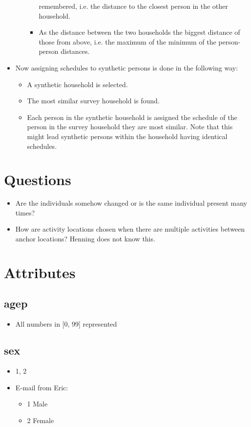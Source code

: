 \documentclass[12pt]{article}
\begin{document}
\begin{itemize}
\begin{itemize}
\begin{itemize}
remembered, i.e. the distance to the closest person in the other household.
\item
As the distance between the two households the biggest distance of those from
above, i.e. the maximum of the minimum of the person-person distances.
\end{itemize}
\end{itemize}
\item
Now assigning schedules to synthetic persons is done in the following way:
\begin{itemize}
\item
A synthetic household is selected.
\item
The most similar survey household is found.
\item
Each person in the synthetic household is assigned the schedule of the person in
the survey household they are most similar. Note that this might lead synthetic
persons within the household having identical schedules.
\end{itemize}
\end{itemize}

\section{Questions}
\begin{itemize}
\item
Are the individuals somehow changed or is the same individual present many
times?
\item 
How are activity locations chosen when there are multiple activities between
anchor locations? Henning does not know this.
\end{itemize}

\section{Attributes}
\subsection{agep}
\begin{itemize}
\item All numbers in [0, 99] represented
\end{itemize}

\subsection{sex}
\begin{itemize}
\item 1, 2
\item E-mail from Eric:
\begin{itemize}
\item 1 Male
\item 2 Female
\end{itemize}
\end{itemize}
\end{document}
